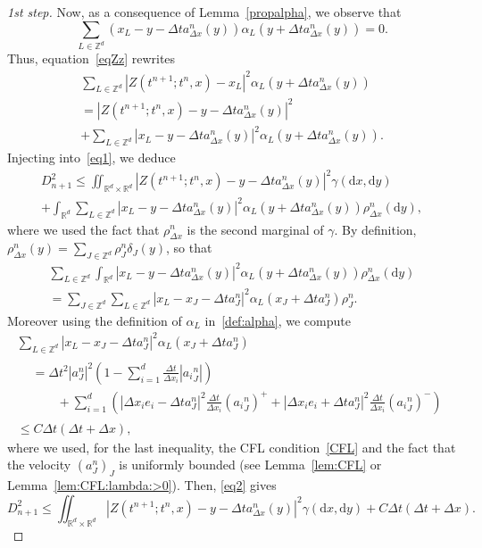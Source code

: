 \documentclass[11pt]{article}
\theoremstyle{definition}
\numberwithin{equation}{section}
\newcommand*{\dd}{\mathrm{d}}
\newcommand*{\dx}{\dd x}
\newcommand*{\dy}{\dd y}
\newcommand*\RR{\mathbb{R}}
\newcommand*\ZZ{\mathbb{Z}}
\newenvironment{step}[1]{\begin{proof}[#1]}{\let\qed\relax \end{proof}}
\begin{document}
\begin{step}{1st step}
Now, as a consequence of Lemma~\ref{propalpha}, we observe that
\[
\sum_{L\in \ZZ^d} (x_L-y-\Delta t a^n_{\Delta x}(y)) \alpha_L(y+\Delta t a^n_{\Delta x}(y)) = 0.
\]
Thus, equation~\eqref{eqZz} rewrites
\begin{multline*}
\sum_{L\in \ZZ^d}|Z(t^{n+1};t^n,x) - x_L|^2 \alpha_L(y+\Delta t a^n_{\Delta x}(y))\\
= |Z(t^{n+1};t^n,x)-y-\Delta t a^n_{\Delta x}(y)|^2
\\
+ \sum_{L\in \ZZ^d} |x_L-y-\Delta t a^n_{\Delta x}(y)|^2 \alpha_L(y+\Delta t a^n_{\Delta x}(y)).
\end{multline*}
Injecting into~\eqref{eq1}, we deduce
\begin{multline}
D_{n+1}^2 \leq \iint_{\RR^d\times\RR^d} |Z(t^{n+1};t^n,x)-y-\Delta t a^n_{\Delta x}(y)|^2 \gamma(\dx,\dy)\\
+ \int_{\RR^d} \sum_{L\in \ZZ^d} |x_L-y-\Delta t a^n_{\Delta x}(y) |^2 \alpha_L(y+\Delta t a^n_{\Delta x}(y)) \rho_{\Delta x}^n(\dy), \label{eq2}
\end{multline}
where we used the fact that $\rho_{\Delta x}^n$ is the second marginal of $\gamma$. By definition, $\rho_{\Delta x}^n(y) = \sum_{J\in\ZZ^d} \rho_J^n \delta_J(y)$, so that
\begin{multline*}
\sum_{L\in \ZZ^d} \int_{\RR^d} |x_L-y-\Delta t a^n_{\Delta x}(y)|^2 \alpha_L(y+\Delta t a^n_{\Delta x}(y)) \rho_{\Delta x}^n(\dy) \\
= \sum_{J\in \ZZ^d} \sum_{L\in \ZZ^d} |x_L-x_J-\Delta t a^n_J|^2 \alpha_L(x_J+\Delta t a^n_J) \rho_J^n.
\end{multline*}
Moreover using the definition of $\alpha_L$ in~\eqref{def:alpha}, we compute
\begin{multline*}
\sum_{L\in \ZZ^d} |x_L-x_J-\Delta t a^n_J|^2 \alpha_L(x_J+\Delta t a^n_J)\\
\begin{aligned}
&= \Delta t^2 |a_J^n|^2 \left(1-\sum_{i=1}^d \frac{\Delta t}{\Delta x_i} |{a_i}_J^n|\right) \\
&\qquad+ \sum_{i=1}^d \left(|\Delta x_i e_i -\Delta t a^n_J|^2 \frac{\Delta t}{\Delta x_i} ({a_i}_J^n)^+ +
|\Delta x_i e_i +\Delta t a^n_J|^2 \frac{\Delta t}{\Delta x_i} ({a_i}_J^n)^- \right)
\end{aligned}\\
\leq C\Delta t(\Delta t + \Delta x),
\end{multline*}
where we used, for the last inequality, the CFL condition~\eqref{CFL} and the fact that the velocity $(a_J^n)_J$ is uniformly bounded (see Lemma~\ref{lem:CFL} or Lemma~\ref{lem:CFL:lambda:>0}). Then, \eqref{eq2} gives
\begin{equation}\label{eqD1}
D_{n+1}^2 \leq \iint_{\RR^d\times\RR^d} |Z(t^{n+1};t^n,x)-y-\Delta t a^n_{\Delta x}(y)|^2 \gamma(\dx,\dy) + C \Delta t (\Delta t+\Delta x).
\end{equation}
\end{step}
\end{document}
